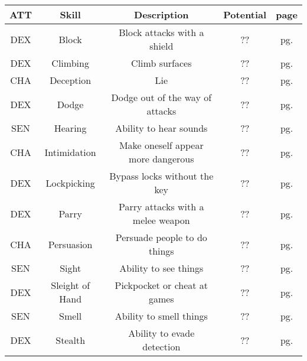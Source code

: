 


\begin{table}[h!]
    \begin{tabular}{|c|c|c|c|c|}
        \hline
        ATT & Skill & Description & Potential & page \\
        \hline
        DEX & Block & Block attacks with a shield & ?? & pg. \pageref{skill:block} \\
        DEX & Climbing & Climb surfaces & ?? & pg. \pageref{skill:climbing} \\
        CHA & Deception & Lie & ?? & pg. \pageref{skill:deception} \\
        DEX & Dodge & Dodge out of the way of attacks & ?? & pg. \pageref{skill:dodge} \\
        SEN & Hearing & Ability to hear sounds & ?? & pg. \pageref{skill:hearing} \\
        CHA & Intimidation & Make oneself appear more dangerous & ?? & pg. \pageref{skill:intimidation} \\
        DEX & Lockpicking & Bypass locks without the key & ?? & pg. \pageref{skill:lockpicking} \\
        DEX & Parry & Parry attacks with a melee weapon & ?? & pg. \pageref{skill:parry} \\
        CHA & Persuasion & Persuade people to do things & ?? & pg. \pageref{skill:persuasion} \\
        SEN & Sight & Ability to see things & ?? & pg. \pageref{skill:sight} \\
        DEX & Sleight of Hand & Pickpocket or cheat at games & ?? & pg. \pageref{skill:sleight-of-hand} \\
        SEN & Smell & Ability to smell things & ?? & pg. \pageref{skill:smell} \\
        DEX & Stealth & Ability to evade detection & ?? & pg. \pageref{skill:stealth} \\
        \hline
    \end{tabular}
    \label{tab:general-skills}
\end{table}

